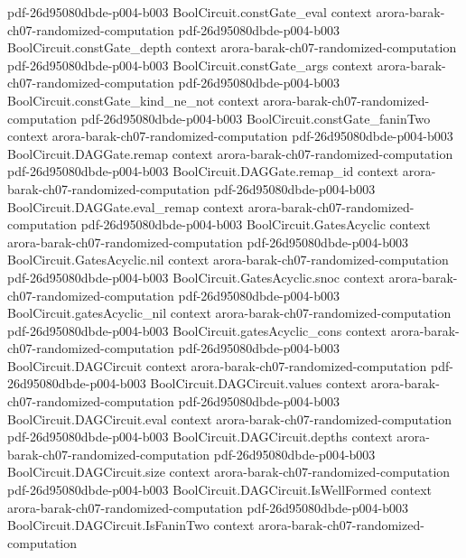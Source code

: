 \begin{theorem}
  {pdf-26d95080dbde-p004-b003}
\proofstep
  {BoolCircuit.constGate_eval}
  {context}
  {arora-barak-ch07-randomized-computation}
  {pdf-26d95080dbde-p004-b003}
\proofstep
  {BoolCircuit.constGate_depth}
  {context}
  {arora-barak-ch07-randomized-computation}
  {pdf-26d95080dbde-p004-b003}
\proofstep
  {BoolCircuit.constGate_args}
  {context}
  {arora-barak-ch07-randomized-computation}
  {pdf-26d95080dbde-p004-b003}
\proofstep
  {BoolCircuit.constGate_kind_ne_not}
  {context}
  {arora-barak-ch07-randomized-computation}
  {pdf-26d95080dbde-p004-b003}
\proofstep
  {BoolCircuit.constGate_faninTwo}
  {context}
  {arora-barak-ch07-randomized-computation}
  {pdf-26d95080dbde-p004-b003}
\proofstep
  {BoolCircuit.DAGGate.remap}
  {context}
  {arora-barak-ch07-randomized-computation}
  {pdf-26d95080dbde-p004-b003}
\proofstep
  {BoolCircuit.DAGGate.remap_id}
  {context}
  {arora-barak-ch07-randomized-computation}
  {pdf-26d95080dbde-p004-b003}
\proofstep
  {BoolCircuit.DAGGate.eval_remap}
  {context}
  {arora-barak-ch07-randomized-computation}
  {pdf-26d95080dbde-p004-b003}
\proofstep
  {BoolCircuit.GatesAcyclic}
  {context}
  {arora-barak-ch07-randomized-computation}
  {pdf-26d95080dbde-p004-b003}
\proofstep
  {BoolCircuit.GatesAcyclic.nil}
  {context}
  {arora-barak-ch07-randomized-computation}
  {pdf-26d95080dbde-p004-b003}
\proofstep
  {BoolCircuit.GatesAcyclic.snoc}
  {context}
  {arora-barak-ch07-randomized-computation}
  {pdf-26d95080dbde-p004-b003}
\proofstep
  {BoolCircuit.gatesAcyclic_nil}
  {context}
  {arora-barak-ch07-randomized-computation}
  {pdf-26d95080dbde-p004-b003}
\proofstep
  {BoolCircuit.gatesAcyclic_cons}
  {context}
  {arora-barak-ch07-randomized-computation}
  {pdf-26d95080dbde-p004-b003}
\proofstep
  {BoolCircuit.DAGCircuit}
  {context}
  {arora-barak-ch07-randomized-computation}
  {pdf-26d95080dbde-p004-b003}
\proofstep
  {BoolCircuit.DAGCircuit.values}
  {context}
  {arora-barak-ch07-randomized-computation}
  {pdf-26d95080dbde-p004-b003}
\proofstep
  {BoolCircuit.DAGCircuit.eval}
  {context}
  {arora-barak-ch07-randomized-computation}
  {pdf-26d95080dbde-p004-b003}
\proofstep
  {BoolCircuit.DAGCircuit.depths}
  {context}
  {arora-barak-ch07-randomized-computation}
  {pdf-26d95080dbde-p004-b003}
\proofstep
  {BoolCircuit.DAGCircuit.size}
  {context}
  {arora-barak-ch07-randomized-computation}
  {pdf-26d95080dbde-p004-b003}
\proofstep
  {BoolCircuit.DAGCircuit.IsWellFormed}
  {context}
  {arora-barak-ch07-randomized-computation}
  {pdf-26d95080dbde-p004-b003}
\proofstep
  {BoolCircuit.DAGCircuit.IsFaninTwo}
  {context}
  {arora-barak-ch07-randomized-computation}

\end{theorem}
